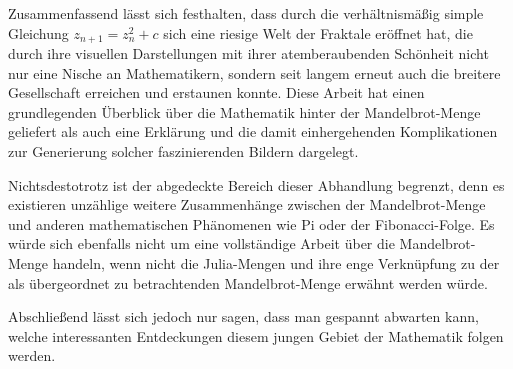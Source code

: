 
Zusammenfassend lässt sich festhalten, dass durch die verhältnismäßig simple
Gleichung $z_{n+1} = z_n^2 + c$ sich eine riesige Welt der Fraktale eröffnet
hat, die durch ihre visuellen Darstellungen mit ihrer atemberaubenden Schönheit
nicht nur eine Nische an Mathematikern, sondern seit langem erneut auch die
breitere Gesellschaft erreichen und erstaunen konnte.
Diese Arbeit hat einen grundlegenden Überblick über die Mathematik hinter der
Mandelbrot-Menge geliefert als auch eine Erklärung und die damit einhergehenden
Komplikationen zur Generierung solcher faszinierenden Bildern dargelegt.

Nichtsdestotrotz ist der abgedeckte Bereich dieser Abhandlung begrenzt, denn es
existieren unzählige weitere Zusammenhänge zwischen der Mandelbrot-Menge und
anderen mathematischen Phänomenen wie Pi oder der Fibonacci-Folge.
Es würde sich ebenfalls nicht um eine vollständige Arbeit über die
Mandelbrot-Menge handeln, wenn nicht die Julia-Mengen und ihre enge Verknüpfung
zu der als übergeordnet zu betrachtenden Mandelbrot-Menge erwähnt werden würde.

Abschließend lässt sich jedoch nur sagen, dass man gespannt abwarten kann,
welche interessanten Entdeckungen diesem jungen Gebiet der Mathematik folgen werden.